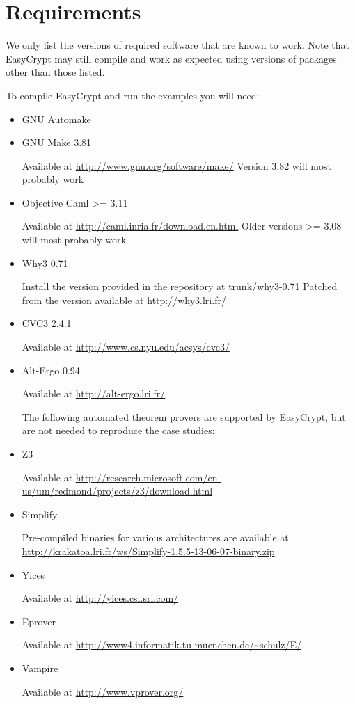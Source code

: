 \section{Requirements}

We only list the versions of required software that are known to
work. Note that EasyCrypt may still compile and work as expected using
versions of packages other than those listed.

To compile EasyCrypt and run the examples you will need:

\begin{itemize}
\item GNU Automake

\item GNU Make 3.81

  Available at \url{http://www.gnu.org/software/make/}
  Version 3.82 will most probably work

\item Objective Caml >= 3.11
 
  Available at \url{http://caml.inria.fr/download.en.html}
  Older versions >= 3.08 will most probably work

\item Why3 0.71
 
  Install the version provided in the repository at trunk/why3-0.71
  Patched from the version available at \url{http://why3.lri.fr/}

\item CVC3 2.4.1

  Available at \url{http://www.cs.nyu.edu/acsys/cvc3/}

\item Alt-Ergo 0.94
 
  Available at \url{http://alt-ergo.lri.fr/}

The following automated theorem provers are supported by EasyCrypt,
but are not needed to reproduce the case studies:

\item Z3 

  Available at
  \url{http://research.microsoft.com/en-us/um/redmond/projects/z3/download.html}

\item Simplify

  Pre-compiled binaries for various architectures are available at
  \url{http://krakatoa.lri.fr/ws/Simplify-1.5.5-13-06-07-binary.zip}

\item Yices

  Available at \url{http://yices.csl.sri.com/}

\item Eprover

  Available at \url{http://www4.informatik.tu-muenchen.de/~schulz/E/}

\item Vampire

  Available at \url{http://www.vprover.org/}

\end{itemize}

